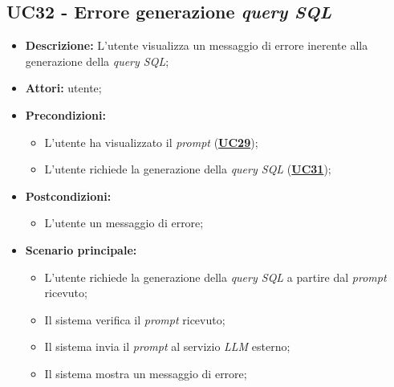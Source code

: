 \subsection{UC32 - Errore generazione \textit{query SQL}}
\label{sec:UC32}
\begin{itemize}
	\item \textbf{Descrizione:} L'utente visualizza un messaggio di errore inerente alla generazione della \textit{query SQL};
	\item \textbf{Attori:} utente;
	\item \textbf{Precondizioni:} 
	\begin{itemize}
		\item L'utente ha visualizzato il \textit{prompt} (\hyperref[sec:UC29]{\textbf{UC29}});
		\item L'utente richiede la generazione della \textit{query SQL} (\hyperref[sec:UC31]{\textbf{UC31}});
	\end{itemize}
	\item \textbf{Postcondizioni:} 
	\begin{itemize}
		\item L'utente un messaggio di errore;
	\end{itemize}
	\item \textbf{Scenario principale:}
	\begin{itemize}
		\item L'utente richiede la generazione della \textit{query SQL} a partire dal \textit{prompt} ricevuto;
		\item Il sistema verifica il \textit{prompt} ricevuto;
		\item Il sistema invia il \textit{prompt} al servizio \textit{LLM} esterno;
		\item Il sistema mostra un messaggio di errore;
	\end{itemize}
\end{itemize}

